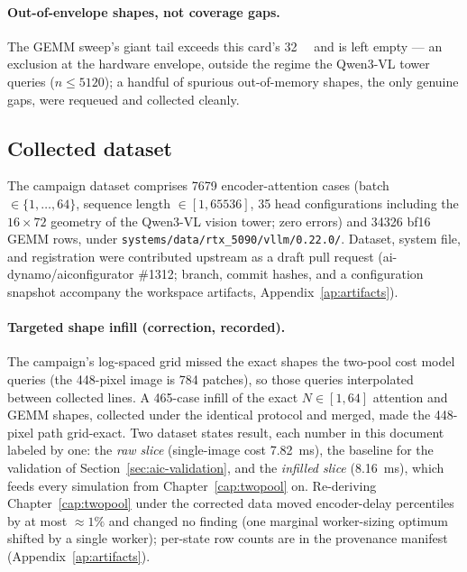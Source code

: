 \paragraph{Out-of-envelope shapes, not coverage gaps.} The GEMM sweep's
giant tail exceeds this card's \SI{32}{\gibi\byte} and is left empty ---
an exclusion at the hardware envelope, outside the regime the Qwen3-VL
tower queries ($n\le\num{5120}$); a handful of spurious out-of-memory
shapes, the only genuine gaps, were requeued and collected cleanly.

\subsection{Collected dataset}

The campaign dataset comprises \num{7679} encoder-attention cases (batch
$\in\{1,\dots,64\}$, sequence length $\in[1, 65536]$, 35 head configurations
including the $16\times 72$ geometry of the Qwen3-VL vision tower; zero
errors) and \num{34326} bf16 GEMM rows, under
\texttt{systems/data/rtx\_5090/vllm/0.22.0/}. Dataset, system file, and
registration were contributed upstream as a draft pull request
(ai-dynamo/aiconfigurator \#1312; branch, commit hashes, and a configuration
snapshot accompany the workspace artifacts, Appendix~\ref{ap:artifacts}).

\paragraph{Targeted shape infill (correction, recorded).} The campaign's
log-spaced grid missed the exact shapes the two-pool cost model queries
(the 448-pixel image is 784 patches), so those queries interpolated between
collected lines. A 465-case infill of the exact $N \in [1,64]$ attention
and GEMM shapes, collected under the identical protocol and merged, made
the 448-pixel path grid-exact. Two dataset states result, each number in
this document labeled by one: the \emph{raw slice} (single-image cost
\SI{7.82}{\milli\second}), the baseline for the validation of
Section~\ref{sec:aic-validation}, and the \emph{infilled slice}
(\SI{8.16}{\milli\second}), which feeds every simulation from
Chapter~\ref{cap:twopool} on. Re-deriving Chapter~\ref{cap:twopool} under
the corrected data moved encoder-delay percentiles by at most
${\approx}1\%$ and changed no finding (one marginal worker-sizing
optimum shifted by a single worker); per-state row counts are in the
provenance manifest (Appendix~\ref{ap:artifacts}).

